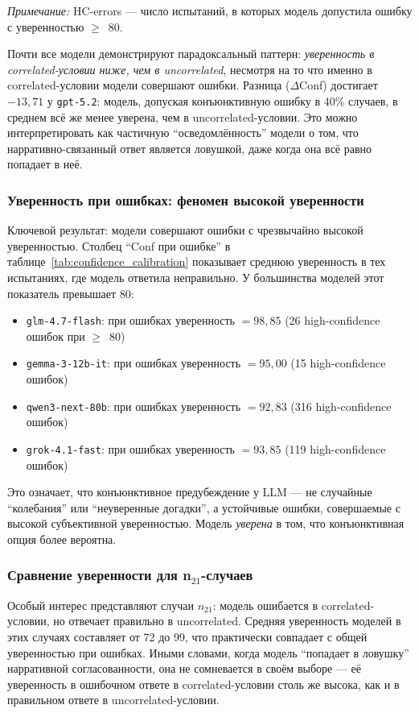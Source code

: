 \textit{Примечание:} HC-errors --- число испытаний, в которых модель допустила ошибку с уверенностью $\ge$~80.

Почти все модели демонстрируют парадоксальный паттерн: \textit{уверенность в correlated-условии ниже, чем в uncorrelated}, несмотря на то что именно в correlated-условии модели совершают ошибки. Разница ($\Delta$Conf) достигает $-13{,}71$ у \texttt{gpt-5.2}: модель, допуская конъюнктивную ошибку в 40\% случаев, в среднем всё же менее уверена, чем в uncorrelated-условии. Это можно интерпретировать как частичную ``осведомлённость'' модели о том, что нарративно-связанный ответ является ловушкой, даже когда она всё равно попадает в неё.

\subsubsection*{Уверенность при ошибках: феномен высокой уверенности}

Ключевой результат: модели совершают ошибки с чрезвычайно высокой уверенностью. Столбец ``Conf при ошибке'' в таблице~\ref{tab:confidence_calibration} показывает среднюю уверенность в тех испытаниях, где модель ответила неправильно. У большинства моделей этот показатель превышает 80:

\begin{itemize}
  \item \texttt{glm-4.7-flash}: при ошибках уверенность $= 98{,}85$ (26 high-confidence ошибок при $\ge$~80)
  \item \texttt{gemma-3-12b-it}: при ошибках уверенность $= 95{,}00$ (15 high-confidence ошибок)
  \item \texttt{qwen3-next-80b}: при ошибках уверенность $= 92{,}83$ (316 high-confidence ошибок)
  \item \texttt{grok-4.1-fast}: при ошибках уверенность $= 93{,}85$ (119 high-confidence ошибок)
\end{itemize}

Это означает, что конъюнктивное предубеждение у LLM --- не случайные ``колебания'' или ``неуверенные догадки'', а устойчивые ошибки, совершаемые с высокой субъективной уверенностью. Модель \textit{уверена} в том, что конъюнктивная опция более вероятна.

\subsubsection*{Сравнение уверенности для n$_{21}$-случаев}

Особый интерес представляют случаи $n_{21}$: модель ошибается в correlated-условии, но отвечает правильно в uncorrelated. Средняя уверенность моделей в этих случаях составляет от 72 до 99, что практически совпадает с общей уверенностью при ошибках. Иными словами, когда модель ``попадает в ловушку'' нарративной согласованности, она не сомневается в своём выборе --- её уверенность в ошибочном ответе в correlated-условии столь же высока, как и в правильном ответе в uncorrelated-условии.

